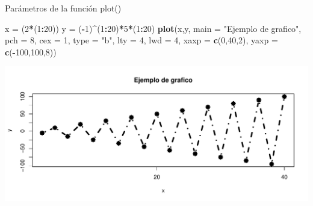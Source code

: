 \documentclass[
  ignorenonframetext,
]{beamer}
\newenvironment{Shaded}{\begin{snugshade}}{\end{snugshade}}
\newcommand{\AttributeTok}[1]{\textcolor[rgb]{0.13,0.29,0.53}{#1}}
\newcommand{\DecValTok}[1]{\textcolor[rgb]{0.00,0.00,0.81}{#1}}
\newcommand{\FunctionTok}[1]{\textcolor[rgb]{0.13,0.29,0.53}{\textbf{#1}}}
\newcommand{\NormalTok}[1]{#1}
\newcommand{\OtherTok}[1]{\textcolor[rgb]{0.56,0.35,0.01}{#1}}
\newcommand{\SpecialCharTok}[1]{\textcolor[rgb]{0.81,0.36,0.00}{\textbf{#1}}}
\newcommand{\StringTok}[1]{\textcolor[rgb]{0.31,0.60,0.02}{#1}}
\begin{document}
\begin{frame}[fragile]{Parámetros de la función plot()}
\label{paruxe1metros-de-la-funciuxf3n-plot-3}
\begin{Shaded}
\begin{Highlighting}[]
\NormalTok{x }\OtherTok{=}\NormalTok{ (}\DecValTok{2}\SpecialCharTok{*}\NormalTok{(}\DecValTok{1}\SpecialCharTok{:}\DecValTok{20}\NormalTok{))}
\NormalTok{y }\OtherTok{=}\NormalTok{ (}\SpecialCharTok{{-}}\DecValTok{1}\NormalTok{)}\SpecialCharTok{\^{}}\NormalTok{(}\DecValTok{1}\SpecialCharTok{:}\DecValTok{20}\NormalTok{)}\SpecialCharTok{*}\DecValTok{5}\SpecialCharTok{*}\NormalTok{(}\DecValTok{1}\SpecialCharTok{:}\DecValTok{20}\NormalTok{)}
\FunctionTok{plot}\NormalTok{(x,y, }\AttributeTok{main =} \StringTok{"Ejemplo de grafico"}\NormalTok{, }\AttributeTok{pch =} \DecValTok{8}\NormalTok{, }\AttributeTok{cex =} \DecValTok{1}\NormalTok{,}
     \AttributeTok{type =} \StringTok{"b"}\NormalTok{, }\AttributeTok{lty =} \DecValTok{4}\NormalTok{, }\AttributeTok{lwd =} \DecValTok{4}\NormalTok{, }
     \AttributeTok{xaxp =} \FunctionTok{c}\NormalTok{(}\DecValTok{0}\NormalTok{,}\DecValTok{40}\NormalTok{,}\DecValTok{2}\NormalTok{), }\AttributeTok{yaxp =} \FunctionTok{c}\NormalTok{(}\SpecialCharTok{{-}}\DecValTok{100}\NormalTok{,}\DecValTok{100}\NormalTok{,}\DecValTok{8}\NormalTok{))}
\end{Highlighting}
\end{Shaded}

\begin{center}\includegraphics[width=0.8\linewidth]{R_base_files/figure-beamer/unnamed-chunk-38-1} \end{center}
\end{frame}
\end{document}

